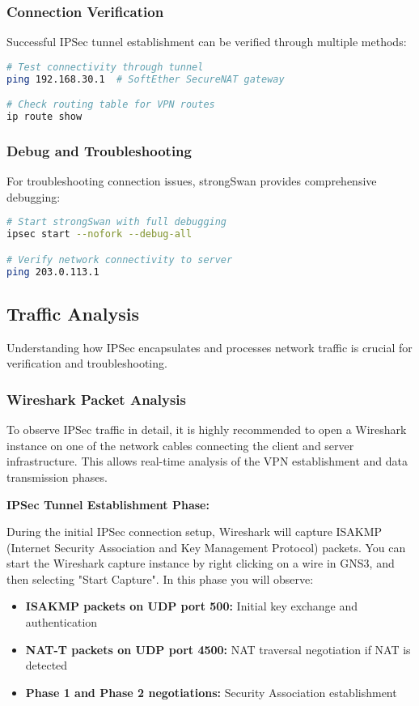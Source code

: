 \subsubsection{Connection Verification}

Successful IPSec tunnel establishment can be verified through multiple methods:

\begin{lstlisting}[language=bash]
# Test connectivity through tunnel
ping 192.168.30.1  # SoftEther SecureNAT gateway

# Check routing table for VPN routes
ip route show

\end{lstlisting}

\subsubsection{Debug and Troubleshooting}

For troubleshooting connection issues, strongSwan provides comprehensive debugging:

\begin{lstlisting}[language=bash]
# Start strongSwan with full debugging
ipsec start --nofork --debug-all

# Verify network connectivity to server
ping 203.0.113.1

\end{lstlisting}

\subsection{Traffic Analysis}

Understanding how IPSec encapsulates and processes network traffic is crucial for verification and troubleshooting.

\subsubsection{Wireshark Packet Analysis}

To observe IPSec traffic in detail, it is highly recommended to open a Wireshark instance on one of the network cables connecting the client and server infrastructure. This allows real-time analysis of the VPN establishment and data transmission phases.

\noindent
\textbf{IPSec Tunnel Establishment Phase:}

\noindent
During the initial IPSec connection setup, Wireshark will capture ISAKMP (Internet Security Association and Key Management Protocol) packets. You can start the Wireshark capture instance by right clicking on a wire in GNS3, and then selecting "Start Capture". In this phase you will observe:
\begin{itemize}
    \item \textbf{ISAKMP packets on UDP port 500:} Initial key exchange and authentication
    \item \textbf{NAT-T packets on UDP port 4500:} NAT traversal negotiation if NAT is detected
    \item \textbf{Phase 1 and Phase 2 negotiations:} Security Association establishment
\end{itemize}

